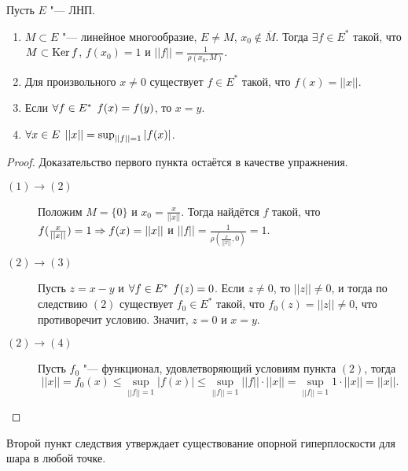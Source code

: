\documentclass[main]{subfiles}
\begin{document}
\begin{corollary}
  Пусть $E$ "--- ЛНП.
  \begin{enumerate}
    \item $M \subset E$ "--- линейное многообразие, $E \ne M$,
      $x_0 \notin \overline{M}$. Тогда $\exists f \in E^*$ такой,
      что $M \subset \operatorname{Ker} f $, $f(x_0) = 1$ и $||f|| = \frac{1}{\rho(x_0, M)}$.
    \item Для произвольного $x \ne 0$ существует $f \in E^*$ такой, что
      $f(x) = ||x||$.
    \item Если $\forall {f \in E^*} \; \, f(x) = f(y)$, то $x = y$.
    \item $\forall {x \in E} \; \, ||x|| = \sup_{||f|| = 1} |f(x)|$.
  \end{enumerate}
\end{corollary}
\begin{proof}
  Доказательство первого пункта остаётся в качестве упражнения.

  \begin{description}
    \item[$(1) \to (2)$]
      Положим $M = \{ 0 \}$ и $x_0 = \frac{x}{||x||}$. Тогда
      найдётся $f$ такой, что $f(\frac{x}{||x||}) = 1 \Rightarrow
      f(x) = ||x||$ и $||f|| = \frac{1}{\rho(\frac{x}{||x||}, {0})} = 1$.
    \item[$(2) \to (3)$]
      Пусть $z = x - y$ и $\forall {f \in E^*} \; \, f(z) = 0$.
      Если $z \ne 0$, то $||z|| \ne 0$, и тогда по следствию $(2)$
      существует $f_0 \in E^*$ такой, что $f_0(z) = ||z|| \ne 0$,
      что противоречит условию. Значит, $z = 0$ и $x = y$.
    \item[$(2) \to (4)$]
      Пусть $f_0$ "--- функционал, удовлетворяющий условиям пункта $(2)$,
      тогда
      \[ ||x|| = f_0(x) \le \sup_{||f|| = 1} |f(x)| \le
	\sup_{||f|| = 1} ||f|| \cdot ||x|| =
      \sup_{||f|| = 1} 1 \cdot ||x|| = ||x||. \]
  \end{description}
\end{proof}

\begin{remark}
  Второй пункт следствия утверждает существование опорной гиперплоскости для шара в любой точке.
\end{remark}
\end{document}
